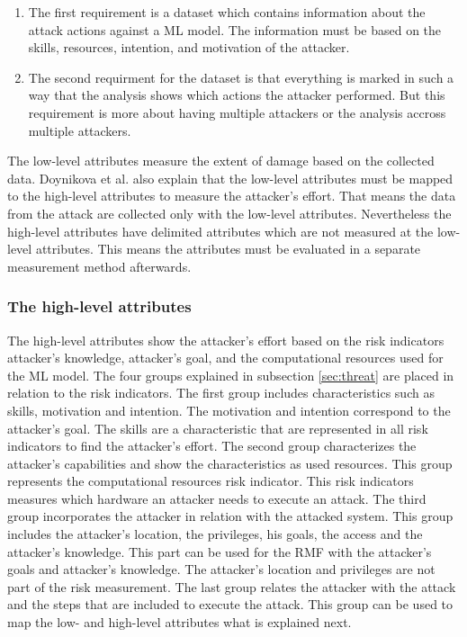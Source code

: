 \begin{enumerate}
  \item The first requirement is a dataset which contains information about the attack actions against a ML model. The information must be based on the skills, resources, intention, and motivation of the attacker.
  \item The second requirment for the dataset is that everything is marked in such a way that the analysis shows which actions the attacker performed. But this requirement is more about having multiple attackers or the analysis accross multiple attackers.
\end{enumerate}

The low-level attributes measure the extent of damage based on the collected data. Doynikova et al. also explain that the low-level attributes must be mapped to the high-level attributes to measure the attacker's effort. That means the data from the attack are collected only with the low-level attributes. Nevertheless the high-level attributes have delimited attributes which are not measured at the low-level attributes. This means the attributes must be evaluated in a separate measurement method afterwards.

\subsubsection*{The high-level attributes}

The high-level attributes show the attacker's effort based on the risk indicators attacker's knowledge, attacker's goal, and the computational resources used for the ML model. The four groups explained in subsection \ref{sec:threat} are placed in relation to the risk indicators. The first group includes characteristics such as skills, motivation and intention. The motivation and intention correspond to the attacker's goal. The skills are a characteristic that are represented in all risk indicators to find the attacker's effort. The second group characterizes the attacker's capabilities and show the characteristics as used resources. This group represents the computational resources risk indicator. This risk indicators measures which hardware an attacker needs to execute an attack. The third group incorporates the attacker in relation with the attacked system. This group includes the attacker's location, the privileges, his goals, the access and the attacker's knowledge. This part can be used for the RMF with the attacker's goals and attacker's knowledge. The attacker's location and privileges are not part of the risk measurement. The last group relates the attacker with the attack and the steps that are included to execute the attack. This group can be used to map the low- and high-level attributes what is explained next.

